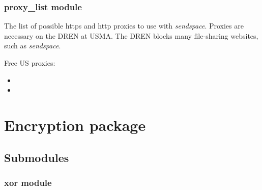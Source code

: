\documentclass[letterpaper,12pt,openany,oneside]{sphinxmanual}
\begin{document}
\subsubsection{proxy\_list module}
\label{Web_Connection:proxy-list-module}\label{Web_Connection:module-webStegFS.Web_Connection.proxy_list}
The list of possible https and http proxies to use with \emph{sendspace}. Proxies are necessary on the DREN at USMA.
The DREN blocks many file-sharing websites, such as \emph{sendspace}.

Free US proxies:
\begin{itemize}
\item {} 

\item {} 

\end{itemize}


\section{Encryption package}
\label{Encryption::doc}\label{Encryption:encryption-package}

\subsection{Submodules}
\label{Encryption:submodules}

\subsubsection{xor module}
\label{Encryption:xor-module}\label{Encryption:module-webStegFS.Encryption.xor}
\end{document}
